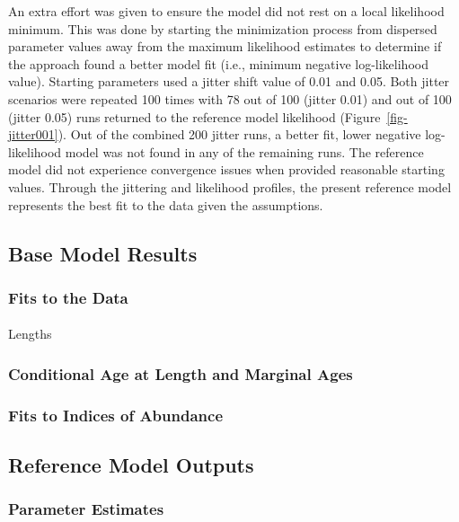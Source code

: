 \documentclass[
]{scrartcl}
\makeatletter
\let\oldparagraph\paragraph
\renewcommand{\paragraph}{
    \@ifstar
      \xxxParagraphStar
      \xxxParagraphNoStar
  }
\newcommand{\xxxParagraphStar}[1]{\oldparagraph*{#1}\mbox{}}
\newcommand{\xxxParagraphNoStar}[1]{\oldparagraph{#1}\mbox{}}
\makeatother
\begin{document}
An extra effort was given to ensure the model did not rest on a local
likelihood minimum. This was done by starting the minimization process
from dispersed parameter values away from the maximum likelihood
estimates to determine if the approach found a better model fit (i.e.,
minimum negative log-likelihood value). Starting parameters used a
jitter shift value of 0.01 and 0.05. Both jitter scenarios were repeated
100 times with 78 out of 100 (jitter 0.01) and out of 100 (jitter 0.05)
runs returned to the reference model likelihood
(Figure~\ref{fig-jitter001}). Out of the combined 200 jitter runs, a
better fit, lower negative log-likelihood model was not found in any of
the remaining runs. The reference model did not experience convergence
issues when provided reasonable starting values. Through the jittering
and likelihood profiles, the present reference model represents the best
fit to the data given the assumptions.

\subsection{Base Model Results}\label{base-model-results}

\subsubsection{Fits to the Data}\label{fits-to-the-data}

\paragraph{Lengths}\label{lengths}

\subsubsection{Conditional Age at Length and Marginal
Ages}\label{conditional-age-at-length-and-marginal-ages}

\subsubsection{Fits to Indices of
Abundance}\label{fits-to-indices-of-abundance}

\subsection{Reference Model Outputs}\label{reference-model-outputs}

\subsubsection{Parameter Estimates}\label{parameter-estimates}
\end{document}
